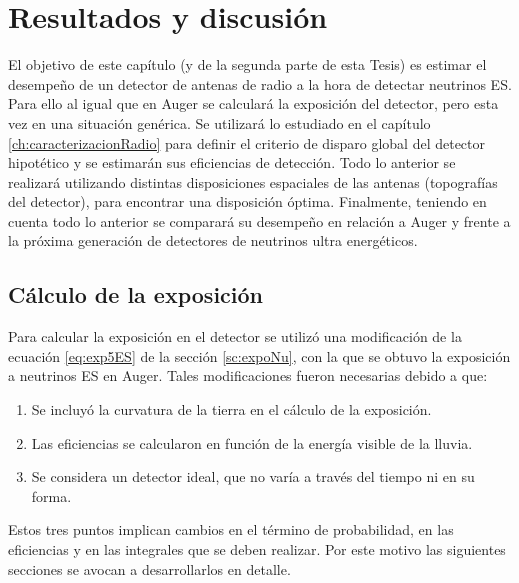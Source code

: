 \chapter{Resultados y discusi\'on}
\label{ch:resultadosRadio}

El objetivo de este cap\'itulo (y de la segunda parte de esta Tesis) es estimar el desempe\~no  de un detector de antenas de radio a la hora de detectar neutrinos ES.
Para ello al igual que en Auger se calcular\'a la exposici\'on del detector, pero esta vez en una situaci\'on gen\'erica.
Se utilizar\'a lo estudiado en el cap\'itulo \ref{ch:caracterizacionRadio} para definir el criterio de disparo global del detector hipot\'etico y se estimar\'an sus eficiencias de detecci\'on.
Todo lo anterior se realizar\'a utilizando distintas disposiciones espaciales de las antenas (topograf\'ias del detector), para encontrar una disposici\'on \'optima.
Finalmente, teniendo en cuenta todo lo anterior se comparar\'a su desempe\~no en relaci\'on a Auger y frente a la pr\'oxima generaci\'on de detectores de neutrinos ultra energ\'eticos.

\section{C\'alculo de la exposici\'on}
	
	Para calcular la exposici\'on en el detector se utiliz\'o una modificaci\'on de la ecuaci\'on \ref{eq:exp5ES} de la secci\'on \ref{sc:expoNu}, con la que se obtuvo la exposici\'on a neutrinos ES en Auger.
	Tales modificaciones fueron necesarias debido a que:
	\begin{enumerate}
	 \item Se incluy\'o la curvatura de la tierra en el c\'alculo de la exposici\'on.
	 \item Las eficiencias se calcularon en funci\'on de la energ\'ia visible de la lluvia.
	 \item Se considera un detector ideal, que no var\'ia a trav\'es del tiempo ni en su forma.
	\end{enumerate}
	Estos tres puntos implican cambios en el t\'ermino de probabilidad, en las eficiencias y en las integrales que se deben realizar.
	Por este motivo las siguientes secciones se avocan a desarrollarlos en detalle.
	

